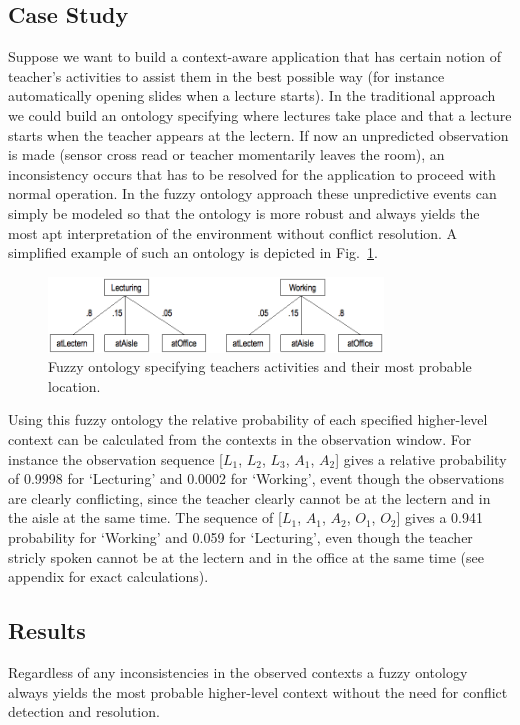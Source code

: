 \documentclass[journal]{vgtc}                %
\begin{document}
\subsection{Case Study}
Suppose we want to build a context-aware application that has certain notion of teacher's activities to assist them in the best possible way (for instance automatically opening slides when a lecture starts). In the traditional approach we could build an ontology specifying where lectures take place and that a lecture starts when the teacher appears at the lectern. If now an unpredicted observation is made (sensor cross read or teacher momentarily leaves the room), an inconsistency occurs that has to be resolved for the application to proceed with normal operation. In the fuzzy ontology approach these unpredictive events can simply be modeled so that the ontology is more robust and always yields the most apt interpretation of the environment without conflict resolution. A simplified example of such an ontology is depicted in Fig.~\ref{fig:fuzzy}.
\begin{figure}[htb]
  \centering
  \includegraphics[width=3.5in]{fuzzy}
  \caption{Fuzzy ontology specifying teachers activities and their most probable location.}
  \label{fig:fuzzy}
\end{figure}
Using this fuzzy ontology the relative probability of each specified higher-level context can be calculated from the contexts in the observation window. For instance the observation sequence [$L_1$, $L_2$, $L_3$, $A_1$, $A_2$] gives a relative probability of 0.9998 for `Lecturing' and 0.0002 for `Working', event though the observations are clearly conflicting, since the teacher clearly cannot be at the lectern and in the aisle at the same time. The sequence of [$L_1$, $A_1$, $A_2$, $O_1$, $O_2$] gives a 0.941 probability for `Working' and 0.059 for `Lecturing', even though the teacher stricly spoken cannot be at the lectern and in the office at the same time (see appendix for exact calculations). 

\subsection{Results}
Regardless of any inconsistencies in the observed contexts a fuzzy ontology always yields the most probable higher-level context without the need for conflict detection and resolution.
\end{document}
